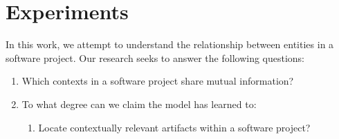 \documentclass[sigconf,review,anonymous]{acmart}
\begin{document}
%

%

  \pagebreak
  \section{Experiments}\label{sec:experiments}

  In this work, we attempt to understand the relationship between entities in a software project. Our research seeks to answer the following questions:

  \begin{enumerate}
    \item Which contexts in a software project share mutual information?
    \item To what degree can we claim the model has learned to:\begin{enumerate}
                                                                 \item Locate contextually relevant artifacts within a software project?
    \end{enumerate}
  \end{enumerate}
\end{document}
